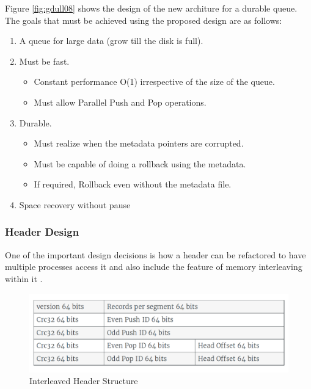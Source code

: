 \documentclass[12pt,a4paper]{article}
\begin{document}
Figure \ref{fig:gdull08} shows the design of the new architure for a durable queue. The goals that must be achieved using the proposed design are as follows:

\begin{enumerate}
	\item A queue for large data (grow till the disk is full).
	\item Must be fast.
	\begin{itemize}
		\item Constant performance O(1) irrespective of the size of the queue.
		\item Must allow Parallel Push and Pop operations. 
	\end{itemize}
	\item Durable.
	\begin{itemize}
		\item Must realize when the metadata pointers are corrupted.
		\item Must be capable of doing a rollback using the metadata. 
		\item If required, Rollback even without the metadata file.
	\end{itemize}
	\item Space recovery without pause
\end{enumerate}

  
  
  \subsubsection{Header Design}
  One of the important design decisions is how a header can be refactored to have multiple processes access it and also include the feature of memory interleaving within it \citep{burnett1970study}.
 
  \begin{figure}[!htb]
  	\centering
  	\textbf{}\par\medskip
  	\includegraphics[scale=0.4]{6}
  	\caption{Interleaved Header Structure}
  	\label{fig:gdull06}
  \end{figure}
  
\end{document}
